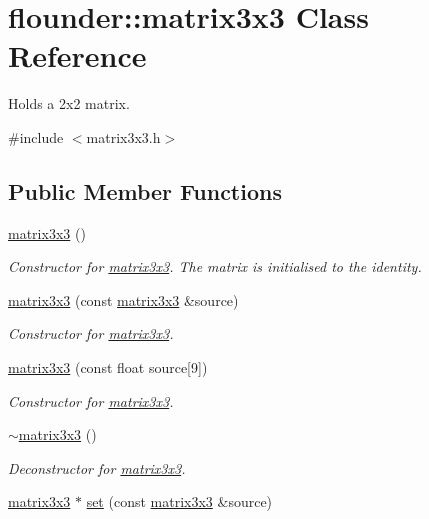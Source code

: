 \hypertarget{classflounder_1_1matrix3x3}{}\section{flounder\+:\+:matrix3x3 Class Reference}
\label{classflounder_1_1matrix3x3}


Holds a 2x2 matrix.  




{\ttfamily \#include $<$matrix3x3.\+h$>$}

\subsection*{Public Member Functions}
\begin{DoxyCompactItemize}
\item 
\hyperlink{classflounder_1_1matrix3x3_a8cec519a274c98786bd433454631bedc}{matrix3x3} ()
\begin{DoxyCompactList}\small\item\em Constructor for \hyperlink{classflounder_1_1matrix3x3}{matrix3x3}. The matrix is initialised to the identity. \end{DoxyCompactList}\item 
\hyperlink{classflounder_1_1matrix3x3_a792adf7aa264b4008dae571b96575a82}{matrix3x3} (const \hyperlink{classflounder_1_1matrix3x3}{matrix3x3} \&source)
\begin{DoxyCompactList}\small\item\em Constructor for \hyperlink{classflounder_1_1matrix3x3}{matrix3x3}. \end{DoxyCompactList}\item 
\hyperlink{classflounder_1_1matrix3x3_afcc212e6794a0630818e111cabdcfcf1}{matrix3x3} (const float source\mbox{[}9\mbox{]})
\begin{DoxyCompactList}\small\item\em Constructor for \hyperlink{classflounder_1_1matrix3x3}{matrix3x3}. \end{DoxyCompactList}\item 
\hyperlink{classflounder_1_1matrix3x3_a9c59ba01efb971983a30a5d1f57b3f35}{$\sim$matrix3x3} ()
\begin{DoxyCompactList}\small\item\em Deconstructor for \hyperlink{classflounder_1_1matrix3x3}{matrix3x3}. \end{DoxyCompactList}\item 
\hyperlink{classflounder_1_1matrix3x3}{matrix3x3} $\ast$ \hyperlink{classflounder_1_1matrix3x3_a92f9629e15583801761d99116bc8fe46}{set} (const \hyperlink{classflounder_1_1matrix3x3}{matrix3x3} \&source)

\end{DoxyCompactItemize}
